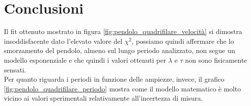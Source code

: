 \documentclass{article}
\begin{document}
    \section{Conclusioni}
    Il fit ottenuto mostrato in figura \ref{fig:pendolo_quadrifilare_velocità} si dimostra
    insoddisfacente dato l'elevato valore del $\chi^2$, possiamo quindi affermare che
    lo smorzamento del pendolo, almeno sul lungo periodo analizzato, non segue un modello
    esponenziale e che quindi i valori ottenuti per $\lambda$ e $\tau$ non sono fisicamente
    sensati.\\
    Per quanto riguarda i periodi in funzione delle ampiezze, invece, il grafico 
    \ref{fig:pendolo_quadrifilare_periodo} mostra come il modello matematico è molto
    vicino ai valori sperimentali relativamente all'incertezza di misura.
\end{document}
